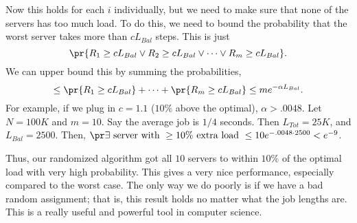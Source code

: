 Now this holds for each $i$ individually, but we need to make sure that none of the servers has too much load. To do this, we need to bound the probability that the worst server takes more than $cL_{Bal}$ steps. This is just
$$\pr{R_1 \geq cL_{Bal} \vee R_2 \geq cL_{Bal} \vee \cdots \vee R_m \geq cL_{Bal}}.$$
We can upper bound this by summing the probabilities,
$$\leq \pr{R_1 \geq cL_{Bal}} + \cdots + \pr{R_m \geq cL_{Bal}} \leq me^{-\alpha L_{Bal}}.$$
For example, if we plug in $c = 1.1$ ($10\%$ above the optimal), $\alpha  > .0048$. Let $N = 100K$ and $m = 10$. Say the average job is $1/4$ seconds. Then $L_{Tot} = 25K$, and $L_{Bal} = 2500$. Then, $\pr{\exists \textrm{ server with } \geq 10\% \textrm{ extra load }} \leq 10 e^{-.0048 \cdot 2500} < e^{-9}$.

Thus, our randomized algorithm got all $10$ servers to within $10\%$ of the optimal load with very high probability. This gives a very nice performance, especially compared to the worst case. The only way we do poorly is if we have a bad random assignment; that is, this result holds no matter what the job lengths are. This is a really useful and powerful tool in computer science.

